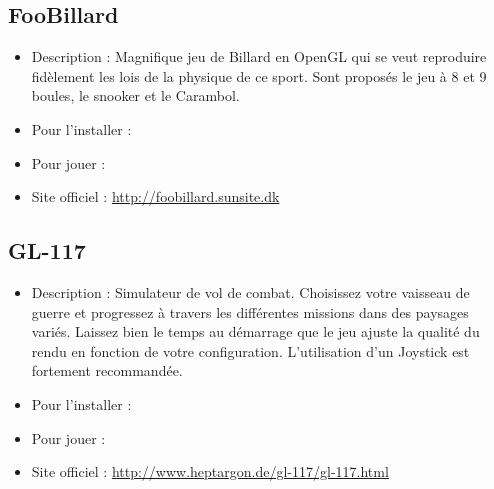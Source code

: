\subsection{FooBillard}
\begin{itemize}
\begingroup
{}
\item Description : Magnifique jeu de Billard en OpenGL qui se veut reproduire fidèlement les lois de la physique de ce sport.  Sont proposés le jeu à 8 et 9 boules, le snooker et le Carambol.{\par}
\item Pour l'installer : 
\item Pour jouer : 
\item Site officiel : \url{http://foobillard.sunsite.dk}{\par}
\endgroup
\end{itemize}
\subsection{GL-117}
\begin{itemize}
\begingroup
{}
\item Description : Simulateur de vol de combat. Choisissez votre vaisseau de guerre et progressez à travers les différentes missions dans des paysages variés. Laissez bien le temps au démarrage que le jeu ajuste la qualité du rendu en fonction de votre configuration. L'utilisation d'un Joystick est fortement recommandée.{\par}
\item Pour l'installer : 
\item Pour jouer : 
\item Site officiel : \url{http://www.heptargon.de/gl-117/gl-117.html}{\par}
\endgroup
\end{itemize}
